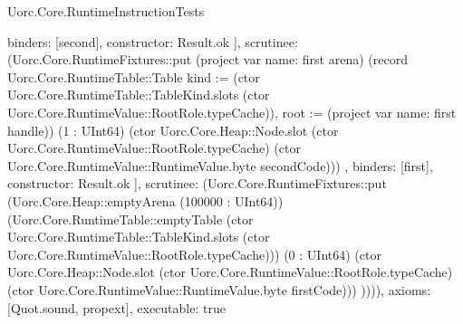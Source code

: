 \begin{lexlean}{Uorc.Core.RuntimeInstructionTests}
\begin{semanticmodule}
{{{{{                  binders: [second],
                  constructor: Result.ok
                }
              ],
              scrutinee: (Uorc.Core.RuntimeFixtures::put (project var{
                name: first
              } arena) (record Uorc.Core.RuntimeTable::Table {kind := (ctor Uorc.Core.RuntimeTable::TableKind.slots (ctor Uorc.Core.RuntimeValue::RootRole.typeCache)), root := (project var{
                name: first
              } handle)}) (1 : UInt64) (ctor Uorc.Core.Heap::Node.slot (ctor Uorc.Core.RuntimeValue::RootRole.typeCache) (ctor Uorc.Core.RuntimeValue::RuntimeValue.byte secondCode)))
            },
            binders: [first],
            constructor: Result.ok
          }
        ],
        scrutinee: (Uorc.Core.RuntimeFixtures::put (Uorc.Core.Heap::emptyArena (100000 : UInt64)) (Uorc.Core.RuntimeTable::emptyTable (ctor Uorc.Core.RuntimeTable::TableKind.slots (ctor Uorc.Core.RuntimeValue::RootRole.typeCache))) (0 : UInt64) (ctor Uorc.Core.Heap::Node.slot (ctor Uorc.Core.RuntimeValue::RootRole.typeCache) (ctor Uorc.Core.RuntimeValue::RuntimeValue.byte firstCode)))
      })))),
  axioms: [Quot.sound, propext],
  executable: true
}


\end{semanticmodule}
\end{lexlean}
